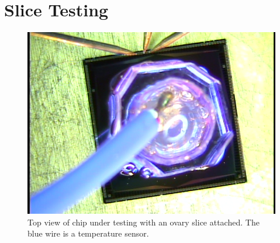 \chapter{Slice Testing}

\begin{figure}
	\centering
	\includegraphics[width=\linewidth]{figures/slice-top.png}
	\caption[Top view of chip under testing with an ovary slice attached.]{Top view of chip under testing with an ovary slice attached. The blue wire is a temperature sensor.}
	\label{slice-top}
\end{figure}
